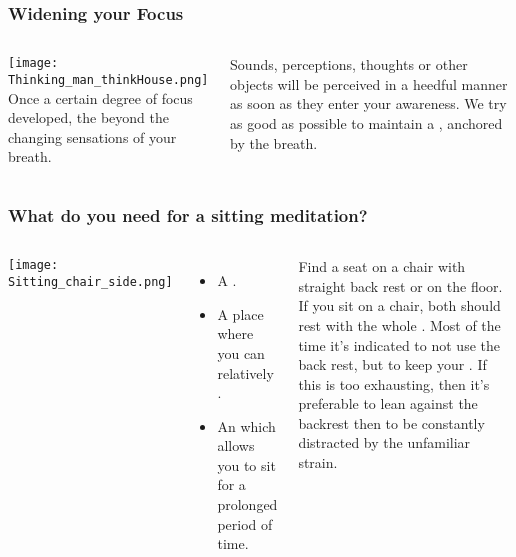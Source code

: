 \begin{frame}
\frametitle{Widening your Focus}
\begin{columns}[c] %

\texttt{[image: Thinking\_man\_thinkHouse.png]}
Once a certain degree of focus developed, the  beyond the changing sensations of your breath. 

Sounds, perceptions, thoughts or other objects will be perceived in a heedful manner as soon as they enter your awareness. We try as good as possible to maintain a , anchored by the breath.
\end{columns}

\end{frame}

\begin{frame}
\frametitle{What do you need for a sitting meditation?}

\begin{columns}[c] %

\texttt{[image: Sitting\_chair\_side.png]}
\begin{itemize}
\item A . 
\item A place where you can relatively . 
\item An  which allows you to sit for a prolonged period of time. 
\end{itemize}
Find a seat on a chair with straight back rest or on the floor. If you sit on a chair, both  should rest with the whole . Most of the time it’s indicated to not use the back rest, but to keep your . If this is too exhausting, then it’s preferable to lean against the backrest then to be constantly distracted by the unfamiliar strain.
\end{columns}
\end{frame}

